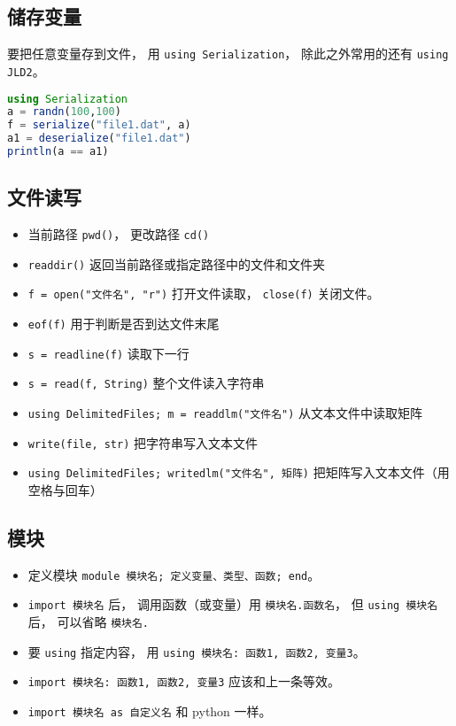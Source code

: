 \subsection{储存变量}
要把任意变量存到文件， 用 \verb|using Serialization|， 除此之外常用的还有 \verb|using JLD2|。
\begin{lstlisting}[language=julia]
using Serialization
a = randn(100,100)
f = serialize("file1.dat", a)
a1 = deserialize("file1.dat")
println(a == a1)
\end{lstlisting}

\subsection{文件读写}
\begin{itemize}
\item 当前路径 \verb|pwd()|， 更改路径 \verb|cd()|
\item \verb|readdir()| 返回当前路径或指定路径中的文件和文件夹
\item \verb|f = open("文件名", "r")| 打开文件读取， \verb|close(f)| 关闭文件。
\item \verb|eof(f)| 用于判断是否到达文件末尾
\item \verb|s = readline(f)| 读取下一行
\item \verb|s = read(f, String)| 整个文件读入字符串
\item \verb|using DelimitedFiles; m = readdlm("文件名")| 从文本文件中读取矩阵
\item \verb|write(file, str)| 把字符串写入文本文件
\item \verb|using DelimitedFiles; writedlm("文件名", 矩阵)| 把矩阵写入文本文件（用空格与回车）
\end{itemize}

\subsection{模块}
\begin{itemize}
\item 定义模块 \verb|module 模块名; 定义变量、类型、函数; end|。
\item \verb|import 模块名| 后， 调用函数（或变量）用 \verb|模块名.函数名|， 但 \verb|using 模块名| 后， 可以省略 \verb|模块名.|
\item 要 \verb|using| 指定内容， 用 \verb|using 模块名: 函数1, 函数2, 变量3|。
\item \verb|import 模块名: 函数1, 函数2, 变量3| 应该和上一条等效。
\item \verb|import 模块名 as 自定义名| 和 python 一样。
\end{itemize}

